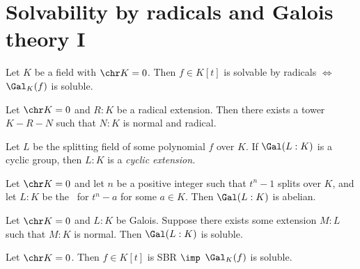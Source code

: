 \documentclass[a4paper]{article}
\begin{document}
\section{Solvability by radicals and Galois theory I}

\begin{ttheorem}
  Let \( K \) be a field with \( \chr K = 0 \).
  Then \( f\in K[t] \) is solvable by radicals \( \iff \) \( \Gal_K(f) \) is soluble.
\end{ttheorem}

\begin{tlemma}
  Let \( \chr K = 0 \) and \( R:K \) be a radical extension.
  Then there exists a tower \( K-R-N \) such that \( N:K \) is normal and radical.
\end{tlemma}

\begin{tdefinition}
  Let \( L \) be the splitting field of some polynomial \( f \) over \( K \).
  If \( \Gal(L:K) \) is a cyclic group, then \( L:K \) is a \it{cyclic} extension.
\end{tdefinition}

\begin{tlemma}
  Let \( \chr K = 0 \) and let \( n \) be a positive integer such that \( t^n-1 \) splits over \( K \), and let \( L:K \) be the \sfe~for \( t^{n}-a \) for some \( a\in K \).
  Then \( \Gal(L:K) \) is abelian.
\end{tlemma}

\begin{ttheorem}
  Let \( \chr K = 0 \) and \( L:K \) be Galois.
  Suppose there exists some extension \( M:L \) such that \( M:K \) is normal.
  Then \( \Gal(L:K) \) is soluble.
\end{ttheorem}

\begin{tcorollary}
  Let \( \chr K = 0 \).
  Then \( f\in K[t] \) is SBR \( \imp \) \( \Gal_K(f) \) is soluble.
\end{tcorollary}
\end{document}
